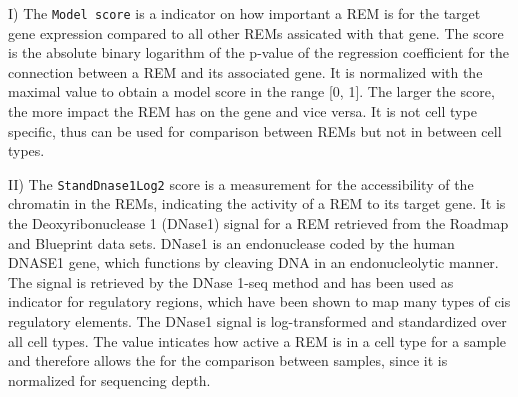 \documentclass[pdftex,12pt,a4paper]{report}
\begin{document}
I) The \texttt{Model score} is a indicator on how important a REM is for the target gene expression compared to all other REMs assicated with that gene. The score is the absolute binary logarithm of the p-value of the regression coefficient for the connection between a REM and its associated gene. It is normalized with the maximal value to obtain a model score in the range [0, 1]. The larger the score, the more impact the REM has on the gene and vice versa. It is not cell type specific, thus can be used for comparison between REMs but not in between cell types.

II) The \texttt{StandDnase1Log2} score is a measurement for the accessibility of the chromatin in the REMs, indicating the activity of a REM to its target gene. It is the Deoxyribonuclease 1 (DNase1) signal for a REM retrieved from the Roadmap\cite{roadmap} and Blueprint\cite{blueprint} data sets. DNase1 is an endonuclease coded by the human DNASE1 gene, which functions by cleaving DNA in an endonucleolytic manner\cite{dnase_nih}. The signal is retrieved by the DNase 1-seq method\cite{dnase_method} and has been used as indicator for regulatory regions, which have been shown to map many types of cis regulatory elements. The DNase1 signal is log-transformed and standardized over all cell types\cite{dnase_cis}. The value inticates how active a REM is in a cell type for a sample and therefore allows the for the comparison between samples, since it is normalized for sequencing depth. 
\end{document}
